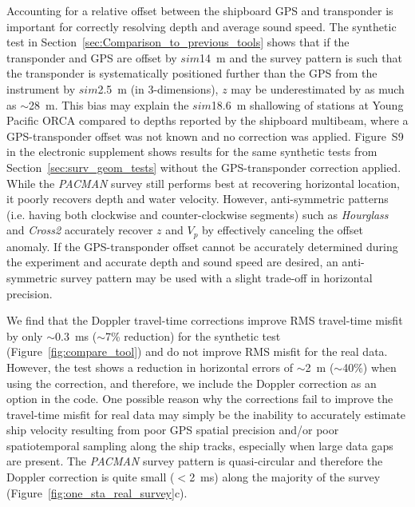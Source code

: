 Accounting for a relative offset between the shipboard GPS and transponder is important for correctly resolving depth and average sound speed. The synthetic test in Section~\ref{sec:Comparison_to_previous_tools} shows that if the transponder and GPS are offset by $sim$14~m and the survey pattern is such that the transponder is systematically positioned further than the GPS from the instrument by $sim$2.5~m (in 3-dimensions), $z$ may be underestimated by as much as $\sim$28~m. This bias may explain the $sim$18.6~m shallowing of stations at Young Pacific ORCA compared to depths reported by the shipboard multibeam, where a GPS-transponder offset was not known and no correction was applied. Figure~S9 in the electronic supplement shows results for the same synthetic tests from Section~\ref{sec:surv_geom_tests} without the GPS-transponder correction applied. While the \textit{PACMAN} survey still performs best at recovering horizontal location, it poorly recovers depth and water velocity. However, anti-symmetric patterns (i.e. having both clockwise and counter-clockwise segments) such as \textit{Hourglass} and \textit{Cross2} accurately recover $z$ and $V_p$ by effectively canceling the offset anomaly. If the GPS-transponder offset cannot be accurately determined during the experiment and accurate depth and sound speed are desired, an anti-symmetric survey pattern may be used with a slight trade-off in horizontal precision.

We find that the Doppler travel-time corrections improve RMS travel-time misfit by only $\sim$0.3~ms ($\sim$7\% reduction) for the synthetic test (Figure~\ref{fig:compare_tool}) and do not improve RMS misfit for the real data. However, the test shows a reduction in horizontal errors of $\sim$2~m ($\sim$40\%) when using the correction, and therefore, we include the Doppler correction as an option in the code. One possible reason why the corrections fail to improve the travel-time misfit for real data may simply be the inability to accurately estimate ship velocity resulting from poor GPS spatial precision and/or poor spatiotemporal sampling along the ship tracks, especially when large data gaps are present. The \textit{PACMAN} survey pattern is quasi-circular and therefore the Doppler correction is quite small ($<$2~ms) along the majority of the survey (Figure~\ref{fig:one_sta_real_survey}c).

